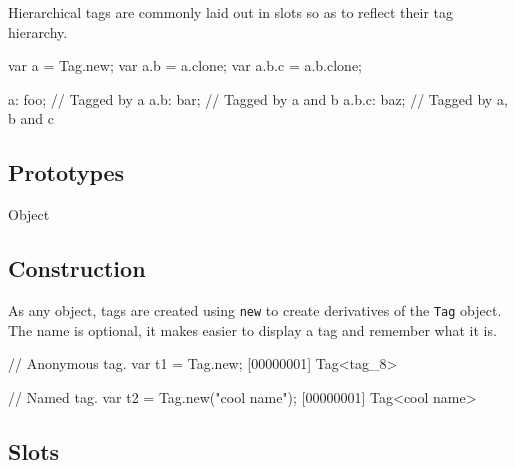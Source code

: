 Hierarchical tags are commonly laid out in slots so as to reflect their tag
hierarchy.

\begin{urbiunchecked}
var a = Tag.new;
var a.b = a.clone;
var a.b.c = a.b.clone;

a:     foo; // Tagged by a
a.b:   bar; // Tagged by a and b
a.b.c: baz; // Tagged by a, b and c
\end{urbiunchecked}


\subsection{Prototypes}
\begin{refObjects}
\item[Object]
\end{refObjects}

\subsection{Construction}
\label{stdlib:tag:ctor}

As any object, tags are created using \lstinline{new} to create derivatives
of the \lstinline{Tag} object.  The name is optional, it makes easier to
display a tag and remember what it is.

\begin{urbiscript}[firstnumber=1]
// Anonymous tag.
var t1 = Tag.new;
[00000001] Tag<tag_8>

// Named tag.
var t2 = Tag.new("cool name");
[00000001] Tag<cool name>
\end{urbiscript}

\subsection{Slots}

